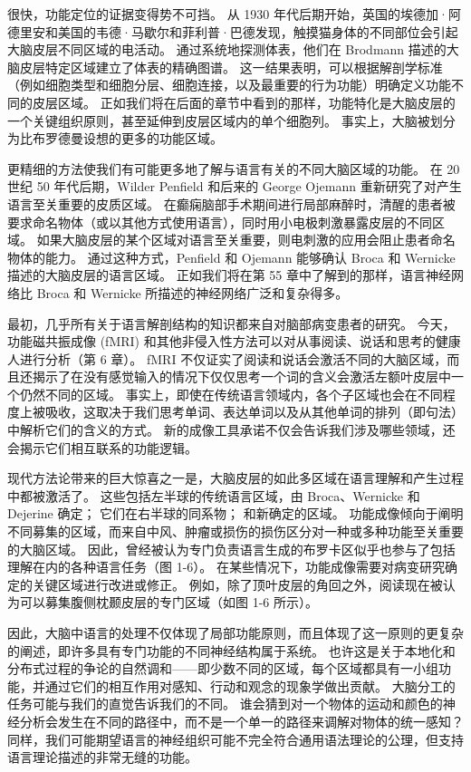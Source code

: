 很快，功能定位的证据变得势不可挡。 从 1930 年代后期开始，英国的埃德加·阿德里安和美国的韦德·马歇尔和菲利普·巴德发现，触摸猫身体的不同部位会引起大脑皮层不同区域的电活动。 通过系统地探测体表，他们在 Brodmann 描述的大脑皮层特定区域建立了体表的精确图谱。 这一结果表明，可以根据解剖学标准（例如细胞类型和细胞分层、细胞连接，以及最重要的行为功能）明确定义功能不同的皮层区域。 正如我们将在后面的章节中看到的那样，功能特化是大脑皮层的一个关键组织原则，甚至延伸到皮层区域内的单个细胞列。 事实上，大脑被划分为比布罗德曼设想的更多的功能区域。

更精细的方法使我们有可能更多地了解与语言有关的不同大脑区域的功能。 在 20 世纪 50 年代后期，Wilder Penfield 和后来的 George Ojemann 重新研究了对产生语言至关重要的皮质区域。 在癫痫脑部手术期间进行局部麻醉时，清醒的患者被要求命名物体（或以其他方式使用语言），同时用小电极刺激暴露皮层的不同区域。 如果大脑皮层的某个区域对语言至关重要，则电刺激的应用会阻止患者命名物体的能力。 通过这种方式，Penfield 和 Ojemann 能够确认 Broca 和 Wernicke 描述的大脑皮层的语言区域。 正如我们将在第 55 章中了解到的那样，语言神经网络比 Broca 和 Wernicke 所描述的神经网络广泛和复杂得多。

最初，几乎所有关于语言解剖结构的知识都来自对脑部病变患者的研究。 今天，功能磁共振成像 (fMRI) 和其他非侵入性方法可以对从事阅读、说话和思考的健康人进行分析（第 6 章）。 fMRI 不仅证实了阅读和说话会激活不同的大脑区域，而且还揭示了在没有感觉输入的情况下仅仅思考一个词的含义会激活左额叶皮层中一个仍然不同的区域。 事实上，即使在传统语言领域内，各个子区域也会在不同程度上被吸收，这取决于我们思考单词、表达单词以及从其他单词的排列（即句法）中解析它们的含义的方式。 新的成像工具承诺不仅会告诉我们涉及哪些领域，还会揭示它们相互联系的功能逻辑。

现代方法论带来的巨大惊喜之一是，大脑皮层的如此多区域在语言理解和产生过程中都被激活了。 这些包括左半球的传统语言区域，由 Broca、Wernicke 和 Dejerine 确定； 它们在右半球的同系物； 和新确定的区域。 功能成像倾向于阐明不同募集的区域，而来自中风、肿瘤或损伤的损伤区分对一种或多种功能至关重要的大脑区域。 因此，曾经被认为专门负责语言生成的布罗卡区似乎也参与了包括理解在内的各种语言任务（图 1-6）。 在某些情况下，功能成像需要对病变研究确定的关键区域进行改进或修正。 例如，除了顶叶皮层的角回之外，阅读现在被认为可以募集腹侧枕颞皮层的专门区域（如图 1-6 所示）。

因此，大脑中语言的处理不仅体现了局部功能原则，而且体现了这一原则的更复杂的阐述，即许多具有专门功能的不同神经结构属于系统。 也许这是关于本地化和分布式过程的争论的自然调和——即少数不同的区域，每个区域都具有一小组功能，并通过它们的相互作用对感知、行动和观念的现象学做出贡献。 大脑分工的任务可能与我们的直觉告诉我们的不同。 谁会猜到对一个物体的运动和颜色的神经分析会发生在不同的路径中，而不是一个单一的路径来调解对物体的统一感知？ 同样，我们可能期望语言的神经组织可能不完全符合通用语法理论的公理，但支持语言理论描述的非常无缝的功能。

